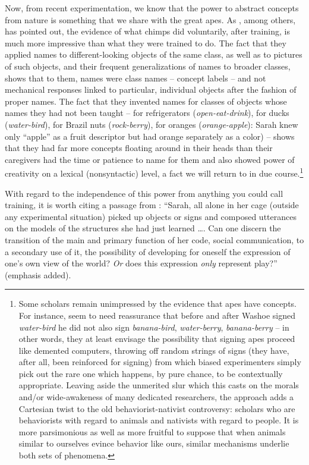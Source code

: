 Now, from recent experimentation, we know that the power to abstract concepts from nature is something that we share with the great apes. As \citet{Mounin1976}, among others, has pointed out, the evidence of what chimps did voluntarily, after training, is much more
impressive than what they were trained to do. The fact that they applied names to different-looking objects of the same class, as well as to pictures of such objects, and their frequent generalizations of names to broader classes, shows that to them, names were class names -- concept labels -- and not mechanical responses linked to particular, individual objects after the fashion of proper names. The fact that they invented names for classes of objects whose names they had not been taught -- for refrigerators (\textit{open-eat-drink}), for ducks (\textit{water-bird}), for Brazil nuts (\textit{rock-berry}), for oranges (\textit{orange-apple}): Sarah knew only ``apple'' as a fruit descriptor but had orange separately as a color) -- shows that they had far more concepts floating around in their heads than their caregivers had the time or patience to name for them and also showed power of creativity on a lexical (nonsyntactic) level, a fact we will return to in due course.\footnote{Some scholars remain unimpressed by the evidence that apes have concepts. For instance, \citet{Seidenberg1979} seem to need reassurance that before and after Washoe signed \textit{water-bird} he did not also sign \textit{banana-bird}, \textit{water-berry}, \textit{banana-berry} -- in other words, they at least envisage the possibility that signing apes proceed like demented computers, throwing off random strings of signs (they have, after all, been reinforced for signing) from which biased experimenters simply pick out the rare one which happens, by pure chance, to be contextually appropriate. Leaving aside the unmerited slur which this casts on the morals and/or wide-awakeness of many dedicated researchers, the approach adds a Cartesian twist to the old behaviorist-nativist controversy: scholars who are behaviorists with regard to animals and nativists with regard to people. It is more parsimonious as well as more fruitful to suppose that when animals similar to ourselves evince behavior like ours, similar mechanisms underlie both sets of phenomena.}

With regard to the independence of this power from anything you could call training, it is worth citing a passage from \citet{Mounin1976}: ``Sarah, all alone in her cage (outside any experimental situation) picked up objects or signs and composed utterances on the models of the structures she had just learned \ldots. Can one discern the transition of the main and primary function of her code, social communication, to a secondary use of it, the possibility of developing for oneself the expression of one's own view of the world? \textit{Or} does this expression \textit{only} represent play?'' (emphasis added).

